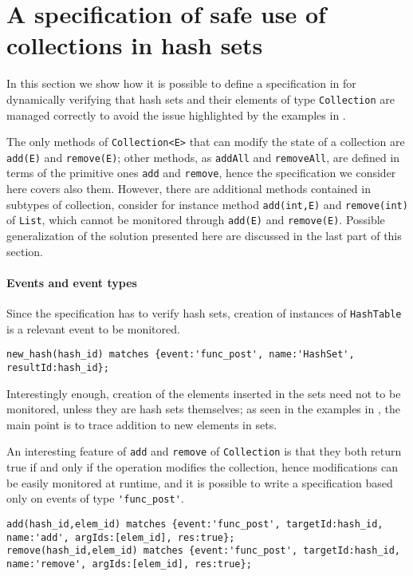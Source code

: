 \section{A specification of safe use of collections in hash sets}
In this section we show how it is possible to define a specification in \rml for dynamically verifying that hash sets and their elements of
type \lstinline{Collection} are managed correctly to avoid the issue highlighted by the examples in .

The only methods of \lstinline{Collection<E>} that can modify the state of a collection are \lstinline{add(E)} and \lstinline{remove(E)}; other methods, as \lstinline{addAll} and \lstinline{removeAll}, are defined in terms of the primitive ones \lstinline{add} and \lstinline{remove}, hence the specification we consider here covers also them. However, there are additional methods contained in subtypes of collection, consider for instance method
\lstinline{add(int,E)} and \lstinline{remove(int)} of \lstinline{List}, which cannot be monitored through \lstinline{add(E)} and \lstinline{remove(E)}. Possible generalization of the solution presented here are discussed in the last part of this section.

\paragraph{Events and event types} Since the specification has to verify hash sets, creation of instances of \lstinline{HashTable} is a relevant event
to be monitored.
\begin{lstlisting}[basicstyle=\ttfamily\scriptsize]
new_hash(hash_id) matches {event:'func_post', name:'HashSet', resultId:hash_id};
\end{lstlisting}
Interestingly enough, creation of the elements inserted in the sets need not to be monitored, unless they are hash sets themselves;
as seen in the examples in , the main point is to trace addition to new elements in sets.

An interesting feature of \lstinline{add} and \lstinline{remove} of \lstinline{Collection} is that they both return true if and only if the operation modifies the collection, hence modifications can be easily monitored at runtime, and it is possible to write a specification based only on events of type \lstinline{'func_post'}.

\begin{lstlisting}[basicstyle=\ttfamily\scriptsize]
add(hash_id,elem_id) matches {event:'func_post', targetId:hash_id, name:'add', argIds:[elem_id], res:true};
remove(hash_id,elem_id) matches {event:'func_post', targetId:hash_id, name:'remove', argIds:[elem_id], res:true};
\end{lstlisting}

